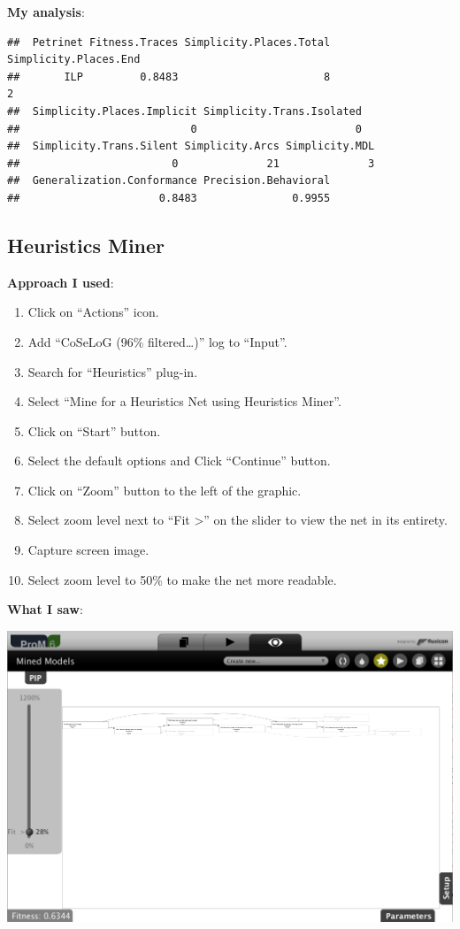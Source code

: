 \documentclass[]{article}
\begin{document}
\textbf{My analysis}:

\begin{verbatim}
##  Petrinet Fitness.Traces Simplicity.Places.Total Simplicity.Places.End
##       ILP         0.8483                       8                     2
##  Simplicity.Places.Implicit Simplicity.Trans.Isolated
##                           0                         0
##  Simplicity.Trans.Silent Simplicity.Arcs Simplicity.MDL
##                        0              21              3
##  Generalization.Conformance Precision.Behavioral
##                      0.8483               0.9955
\end{verbatim}

\subsection{Heuristics Miner}\label{heuristics-miner}

\textbf{Approach I used}:

\begin{enumerate}
\def\labelenumi{\arabic{enumi}.}
\itemsep1pt\parskip0pt
\item
  Click on ``Actions'' icon.
\item
  Add ``CoSeLoG (96\% filtered\ldots{})'' log to ``Input''.
\item
  Search for ``Heuristics'' plug-in.
\item
  Select ``Mine for a Heuristics Net using Heuristics Miner''.
\item
  Click on ``Start'' button.
\item
  Select the default options and Click ``Continue'' button.
\item
  Click on ``Zoom'' button to the left of the graphic.
\item
  Select zoom level next to ``Fit \textgreater{}'' on the slider to view
  the net in its entirety.
\item
  Capture screen image.
\item
  Select zoom level to 50\% to make the net more readable.
\end{enumerate}

\textbf{What I saw}:

\includegraphics{CoSeLoG_Step_05_Filter96_Heuristics_Net.png}
\end{document}
